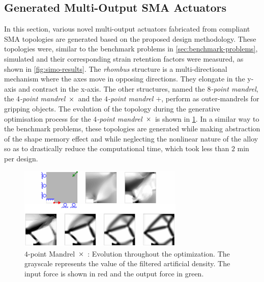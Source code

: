 \subsection{Generated Multi-Output SMA Actuators}
In this section, various novel multi-output actuators fabricated from compliant SMA topologies are generated based on the proposed design methodology. These topologies were, similar to the benchmark problems in \cref{sec:benchmark-problems}, simulated and their corresponding strain retention factors were measured, as shown in \cref{fig:simo-results}. The \textit{rhombus} structure is a multi-directional mechanism where the axes move in opposing directions. They elongate in the y-axis and contract in the x-axis. The other structures, named the \textit{$8$-point mandrel}, the \textit{$4$-point mandrel $\Xsymbol$} and the \textit{$4$-point mandrel $+$}, perform as outer-mandrels for gripping objects. The evolution of the topology during the generative optimisation process for the \textit{$4$-point mandrel $\Xsymbol$} is shown in \cref{fig:TopologyEvolution-mandrel}. In a similar way to the benchmark problems, these topologies are generated while making abstraction of the shape memory effect and while neglecting the nonlinear nature of the alloy so as to drastically reduce the computational time, which took less than $2$ min per design.
\begin{figure}[hbt!]
    \centering
    \includegraphics[width=0.7\textwidth]{images/chap5/06_final_evolve_mandrel_2.pdf}
    \caption{$4$-point Mandrel $\Xsymbol$ : Evolution throughout the optimization. The grayscale represents the value of the filtered artificial density. The input force is shown in red and the output force in green.}
    \label{fig:TopologyEvolution-mandrel}
\end{figure}

